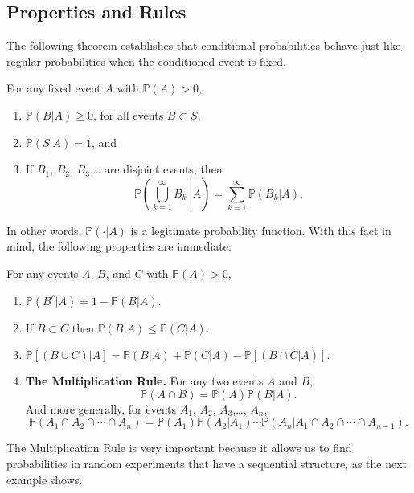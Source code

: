 \subsection{Properties and Rules}
\label{sec-4-6-2}

The following theorem establishes that conditional probabilities
behave just like regular probabilities when the conditioned event is
fixed.

\begin{thm}
For any fixed event \(A\) with \(\mathbb{P}(A)>0\),
\begin{enumerate}
\item \( \mathbb{P} (B|A)\geq 0 \), for all events \( B \subset S\),
\item \( \mathbb{P} (S|A) = 1 \), and
\item If \(B_{1}\), \(B_{2}\), \(B_{3}\),\ldots{} are disjoint events, then
\begin{equation}
\mathbb{P}\left(\left.\bigcup_{k=1}^{\infty}B_{k}\:\right|A\right)=\sum_{k=1}^{\infty}\mathbb{P}(B_{k}|A).
\end{equation}
\end{enumerate}
\end{thm}
In other words, \(\mathbb{P}(\cdot|A)\) is a legitimate probability
function. With this fact in mind, the following properties are
immediate:

\begin{prop}
For any events \(A\), \(B\), and \(C\) with \(\mathbb{P}(A)>0\),
\begin{enumerate}
\item \( \mathbb{P} ( B^{c} | A ) = 1 - \mathbb{P} (B|A).\)
\item If \(B\subset C\) then \(\mathbb{P}(B|A)\leq\mathbb{P}(C|A)\).
\item \( \mathbb{P} [ ( B\cup C ) | A ] = \mathbb{P} (B|A) +
   \mathbb{P}(C|A) - \mathbb{P} [ (B \cap C|A) ].\)
\item \textbf{The Multiplication Rule.} For any two events \(A\) and \(B\),
\begin{equation}
\label{eq-multiplication-rule-short}
\mathbb{P}(A\cap B)=\mathbb{P}(A)\mathbb{P}(B|A).
\end{equation}
And more generally, for events \(A_{1}\), \(A_{2}\), \(A_{3}\),\ldots{},
\(A_{n}\),
\begin{equation}
\label{eq-multiplication-rule-long}
\mathbb{P}(A_{1}\cap A_{2}\cap\cdots\cap A_{n})=\mathbb{P}(A_{1})\mathbb{P}(A_{2}|A_{1})\cdots\mathbb{P}(A_{n}|A_{1}\cap A_{2}\cap\cdots\cap A_{n-1}).
\end{equation}
\end{enumerate}
\end{prop}
The Multiplication Rule is very important because it allows us to find
probabilities in random experiments that have a sequential structure,
as the next example shows.

